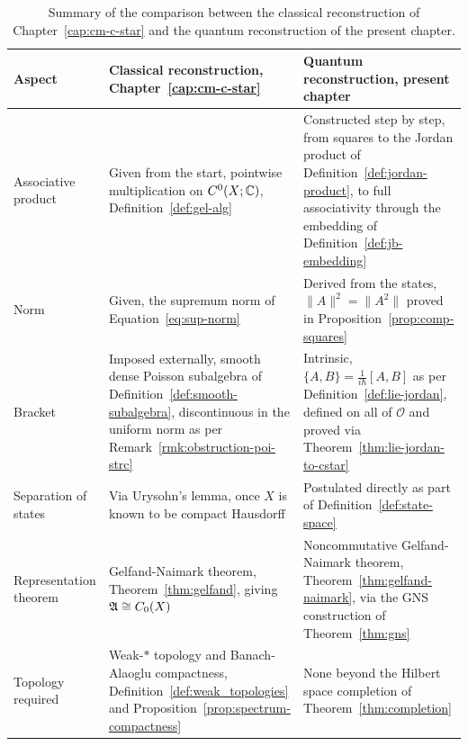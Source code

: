 	\begin{table}[h!]
		\centering
		\small
		\renewcommand{\arraystretch}{1.3}
		\begin{tabular}{|p{}|p{}|p{}|}
			\hline
			\textbf{Aspect} & \textbf{Classical reconstruction, Chapter~\ref{cap:cm-c-star}} & \textbf{Quantum reconstruction, present chapter} \\
			\hline
			Associative product & Given from the start, pointwise multiplication on $C^0(X;\mathbb{C})$, Definition~\ref{def:gel-alg} & Constructed step by step, from squares to the Jordan product of Definition~\ref{def:jordan-product}, to full associativity through the embedding of Definition~\ref{def:jb-embedding} \\
			\hline
			Norm & Given, the supremum norm of Equation~\eqref{eq:sup-norm} & Derived from the states, $\|A\|^2=\|A^2\|$ proved in Proposition~\ref{prop:comp-squares} \\
			\hline
			Bracket & Imposed externally, smooth dense Poisson subalgebra of Definition~\ref{def:smooth-subalgebra}, discontinuous in the uniform norm as per Remark~\ref{rmk:obstruction-poi-strc} & Intrinsic, $\{A,B\}=\tfrac{1}{i\hbar}[A,B]$ as per Definition~\ref{def:lie-jordan}, defined on all of $\mathcal{O}$ and proved via Theorem~\ref{thm:lie-jordan-to-cstar} \\
			\hline
			Separation of states & Via Urysohn's lemma, once $X$ is known to be compact Hausdorff & Postulated directly as part of Definition~\ref{def:state-space} \\
			\hline
			Representation theorem & Gelfand-Naimark theorem, Theorem~\ref{thm:gelfand}, giving $\mathfrak{A}\cong C_0(X)$ & Noncommutative Gelfand-Naimark theorem, Theorem~\ref{thm:gelfand-naimark}, via the GNS construction of Theorem~\ref{thm:gns} \\
			\hline
			Topology required & Weak-$*$ topology and Banach-Alaoglu compactness, Definition~\ref{def:weak_topologies} and Proposition~\ref{prop:spectrum-compactness} & None beyond the Hilbert space completion of Theorem~\ref{thm:completion} \\
			\hline
			
		\end{tabular}
		\caption{Summary of the comparison between the classical reconstruction of Chapter~\ref{cap:cm-c-star} and the quantum reconstruction of the present chapter.}
		\label{tab:concl-comparison}
	\end{table}
	
